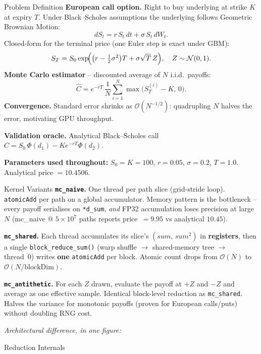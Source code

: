 \documentclass[portrait,a0b,final]{a0poster}
\begin{document}
\hfill
\begin{minipage}[t]{0.315\textwidth}

\begin{posterblock}{Problem Definition}
\textbf{European call option.} Right to buy underlying at strike $K$
at expiry $T$. Under Black--Scholes assumptions the underlying
follows Geometric Brownian Motion:
\[
dS_t = r\,S_t\,dt + \sigma\,S_t\,dW_t.
\]
Closed-form for the terminal price (one Euler step is exact under
GBM):
\[
S_T = S_0\exp\!\Bigl(\bigl(r-\tfrac{1}{2}\sigma^{2}\bigr)T
                     + \sigma\sqrt{T}\,Z\Bigr),\quad
Z\sim\mathcal{N}(0,1).
\]
\textbf{Monte Carlo estimator} -- discounted average of $N$ i.i.d.\
payoffs:
\[
\hat{C} = e^{-rT}\,\frac{1}{N}\sum_{i=1}^{N}\max\!\bigl(S_T^{(i)}-K,\,0\bigr).
\]
\textbf{Convergence.} Standard error shrinks as
$\mathcal{O}(N^{-1/2})$: quadrupling $N$ halves the error, motivating
GPU throughput.
\par\smallskip
\textbf{Validation oracle.} Analytical Black--Scholes call
\(
C = S_0\,\Phi(d_1) - K e^{-rT}\Phi(d_2).
\)
\par\smallskip
\textbf{Parameters used throughout:} $S_0=K=100$, $r=0.05$,
$\sigma=0.2$, $T=1.0$. Analytical price $=\mathbf{10.4506}$.
\end{posterblock}

\begin{posterblock}{Kernel Variants}
\textbf{\texttt{mc\_naive}.} One thread per path slice (grid-stride
loop). \texttt{atomicAdd} per path on a global accumulator. Memory
pattern is the bottleneck -- every payoff serialises on
\texttt{*d\_sum}, \emph{and} FP32 accumulation loses precision at
large $N$ (mc\_naive @ $5\!\times\!10^{7}$ paths reports
price~$=9.95$ vs analytical $10.45$).
\par\smallskip
\textbf{\texttt{mc\_shared}.} Each thread accumulates its slice's
$(sum,\,sum^2)$ in \textbf{registers}, then a single
\texttt{block\_reduce\_sum()} (warp shuffle $\rightarrow$ shared-memory
tree $\rightarrow$ thread~0) writes \textbf{one} \texttt{atomicAdd}
per block. Atomic count drops from $\mathcal{O}(N)$ to
$\mathcal{O}(N/\text{blockDim})$.
\par\smallskip
\textbf{\texttt{mc\_antithetic}.} For each $Z$ drawn, evaluate the
payoff at $+Z$ and $-Z$ and average as one effective sample.
Identical block-level reduction as \texttt{mc\_shared}. Halves the
variance for monotonic payoffs (proven for European calls/puts)
without doubling RNG cost.
\par\medskip
\centerline{\textit{Architectural difference, in one figure:}}
\medskip

\end{posterblock}

\begin{posterblock}{Reduction Internals}

\end{posterblock}

\end{minipage}%
\end{document}
